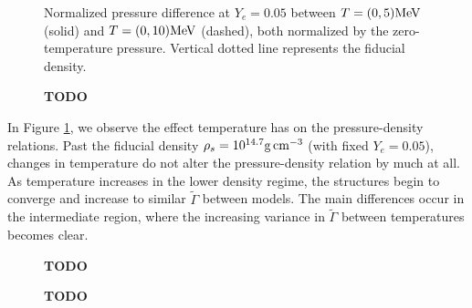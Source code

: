 \begin{figure}
	\centering
	
	\caption[Difference in pressure vs. density for constant $Y_e$, varying temperature]{
		Normalized pressure difference at $Y_e = 0.05$ between $T = (0,5) {\rm MeV}$ (solid) and $T = (0,10) {\rm MeV}$ (dashed), both normalized by the zero-temperature pressure. Vertical dotted line represents the fiducial density.
	}
	\label{fig:dPvsRho}
\end{figure}


\begin{figure}
	\centering
	
	\caption[Adiabatic index vs. density for constant $Y_e$, varying temperature]
	{
		\textbf{TODO}
	}
	\label{fig:GammavsRho}
\end{figure}


In Figure \ref{fig:dPvsRho}, we observe the effect temperature has on the pressure-density relations.  Past the fiducial density $\rho_s = 10^{14.7} {\rm g \, cm^{-3}}$ (with fixed $Y_e = 0.05$), changes in temperature do not alter the pressure-density relation by much at all.  As temperature increases in the lower density regime, the structures begin to converge and increase to similar $\tilde{\Gamma}$ between models.  The main differences occur in the intermediate region, where the increasing variance in $\tilde{\Gamma}$ between temperatures becomes clear.

\begin{figure}
	\centering
	
	\caption[Adiabatic index vs. density for constant $Y_e = 0.3$, varying temperature]
	{
		\textbf{TODO}
	}
	\label{fig:OneGammavsRho}
\end{figure}


\begin{figure}[]
	\centering
	\footnotesize{	
		
	}
	\caption[Adiabatic index vs. density for constant $Y_e = 0.3$, varying temperature]
	{
		\textbf{TODO}
	}
	\label{fig:MultGammavsRho}
\end{figure}
